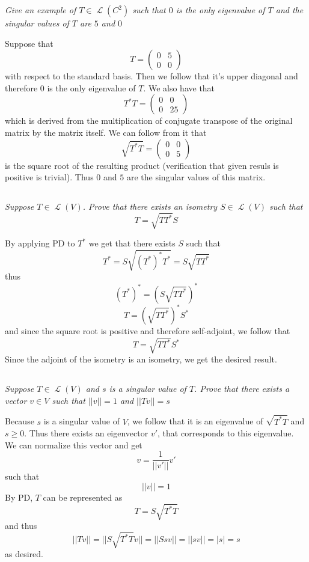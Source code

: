\documentclass[11pt,oneside,titlepage]{book}
\DeclareMathOperator \map {\mathcal {L}}
\begin{document}
\textit{Give an example of $T \in \map(C^2)$ such that $0$ is the only eigenvalue of $T$ and
  the singular values of $T$ are $5$ and $0$}

Suppose that
$$T =
\begin{pmatrix}
  0 & 5 \\
  0 & 0
\end{pmatrix}
$$
with respect to the standard basis.
Then we follow that it's upper diagonal and therefore 0 is the only eigenvalue of $T$.
We also have that 
$$T^* T =
\begin{pmatrix}
  0 & 0 \\
  0 & 25
\end{pmatrix}
$$
which is derived from the multiplication of conjugate transpose of the original matrix
by the matrix itself. We can follow from it that
$$\sqrt{T^* T} =
\begin{pmatrix}
  0 & 0 \\
  0 & 5
\end{pmatrix}
$$
is the square root of the resulting product (verification that given resuls is positive is
trivial). Thus $0$ and $5$ are the singular values of this matrix.

\subsection{}

\textit{Suppose $T \in \map(V)$. Prove that there exists an isometry $S \in \map(V)$ such that 
  $$T = \sqrt{T T^*} S$$
}

By applying PD to  $T^*$ we get that there exists $S$ such that
$$T^* = S \sqrt{(T^*)^* T^*} = S \sqrt{T T^*}$$
thus
$$(T^*)^*= (S \sqrt{T T^*})^* $$
$$T= (\sqrt{T T^*})^* S^* $$
and since the square root is positive and therefore self-adjoint, we follow that 
$$T= \sqrt{T T^*} S^* $$
Since the adjoint of the isometry is an isometry, we get the desired result.

\subsection{}

\textit{Suppose $T \in \map(V)$ and $s$ is a singular value of $T$. Prove that there exists
  a vector $v \in V$ such that $||v|| = 1$ and $||Tv|| = s$}

Because $s$ is a singular value of $V$, we follow that it is an eigenvalue of $\sqrt{T^* T}$
and $s \geq 0$.
Thus there exists an eigenvector $v'$, that corresponds to this eigenvalue. We can normalize
this vector and get
$$v = \frac{1}{||v'||}v' $$
such that
$$||v|| = 1$$
By PD, $T$ can be represented as
$$T = S \sqrt{T^* T}$$
and thus
$$||Tv|| = ||S \sqrt{T^* T} v|| = ||S sv|| = ||s v|| = |s| = s$$
as desired.
\end{document}
